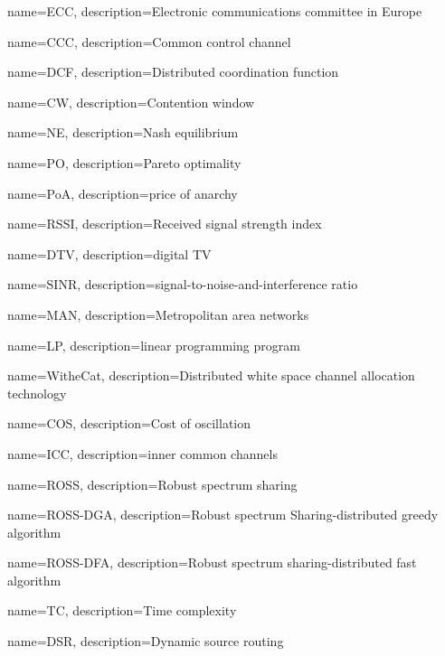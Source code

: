 {
    name=ECC,
    description={Electronic communications committee in Europe}
}


{
    name=CCC,
    description={Common control channel}
}


{
    name=DCF,
    description={Distributed coordination function}
}


{
    name=CW,
    description={Contention window}
}


{
    name=NE,
    description={Nash equilibrium}
}

{
    name=PO,
    description={Pareto optimality}
}


{
    name=PoA,
    description={price of anarchy}
}


{
    name=RSSI,
    description={Received signal strength index}
}


{
    name=DTV,
    description={digital TV}
}

{
    name=SINR,
    description={signal-to-noise-and-interference ratio}
}

{
    name=MAN,
    description={Metropolitan area networks}
}

{
    name=LP,
    description={linear programming program}
}

{
    name=WitheCat,
    description={Distributed white space channel allocation technology}
}

{
    name=COS,
    description={Cost of oscillation}
}

{
    name=ICC,
    description={inner common channels}
}

{
    name=ROSS,
    description={Robust spectrum sharing}
}

{
    name=ROSS-DGA,
    description={Robust spectrum Sharing-distributed greedy algorithm}
}

{
    name=ROSS-DFA,
    description={Robust spectrum sharing-distributed fast algorithm}
}


{
    name=TC,
    description={Time complexity}
}

{
    name=DSR,
    description={Dynamic source routing}
}

